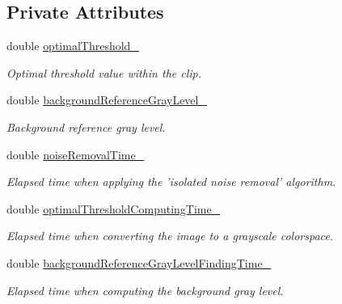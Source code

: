 \subsection*{Private Attributes}
\begin{CompactItemize}
\item 
\hypertarget{class_preprocessor_c60092b388e44bd15d34e49c63e4f489}{
double \hyperlink{class_preprocessor_c60092b388e44bd15d34e49c63e4f489}{optimalThreshold\_\-}}
\label{class_preprocessor_c60092b388e44bd15d34e49c63e4f489}

\begin{CompactList}\small\item\em Optimal threshold value within the clip. \item\end{CompactList}\item 
\hypertarget{class_preprocessor_7a2ed1dcdde4903c6a1260173d61a364}{
double \hyperlink{class_preprocessor_7a2ed1dcdde4903c6a1260173d61a364}{backgroundReferenceGrayLevel\_\-}}
\label{class_preprocessor_7a2ed1dcdde4903c6a1260173d61a364}

\begin{CompactList}\small\item\em Background reference gray level. \item\end{CompactList}\item 
\hypertarget{class_preprocessor_386a5118bd982b2377c1fc5d67ebb7ac}{
double \hyperlink{class_preprocessor_386a5118bd982b2377c1fc5d67ebb7ac}{noiseRemovalTime\_\-}}
\label{class_preprocessor_386a5118bd982b2377c1fc5d67ebb7ac}

\begin{CompactList}\small\item\em Elapsed time when applying the 'isolated noise removal' algorithm. \item\end{CompactList}\item 
\hypertarget{class_preprocessor_d606fe1f0be7f7be60583f59278e2df6}{
double \hyperlink{class_preprocessor_d606fe1f0be7f7be60583f59278e2df6}{optimalThresholdComputingTime\_\-}}
\label{class_preprocessor_d606fe1f0be7f7be60583f59278e2df6}

\begin{CompactList}\small\item\em Elapsed time when converting the image to a grayscale colorspace. \item\end{CompactList}\item 
\hypertarget{class_preprocessor_140ea3fa7bbd4e8fef54912d65c4e926}{
double \hyperlink{class_preprocessor_140ea3fa7bbd4e8fef54912d65c4e926}{backgroundReferenceGrayLevelFindingTime\_\-}}
\label{class_preprocessor_140ea3fa7bbd4e8fef54912d65c4e926}

\begin{CompactList}\small\item\em Elapsed time when computing the background gray level. \item\end{CompactList}\end{CompactItemize}


